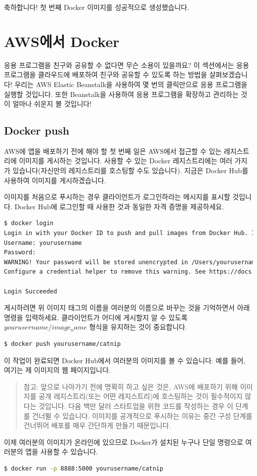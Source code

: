 축하합니다! 첫 번째 Docker 이미지를 성공적으로 생성했습니다.

\section{AWS에서 Docker}
응용 프로그램을 친구와 공유할 수 없다면 무슨 소용이 있을까요? 이 섹션에서는 응용 프로그램을 클라우드에 배포하여 친구와 공유할 수 있도록 하는 방법을 살펴보겠습니다! 우리는 AWS Elastic Beanstalk을 사용하여 몇 번의 클릭만으로 응용 프로그램을 실행할 것입니다. 또한 Beanstalk을 사용하여 응용 프로그램을 확장하고 관리하는 것이 얼마나 쉬운지 볼 것입니다!

\subsection{Docker push}
AWS에 앱을 배포하기 전에 해야 할 첫 번째 일은 AWS에서 접근할 수 있는 레지스트리에 이미지를 게시하는 것입니다. 사용할 수 있는 Docker 레지스트리에는 여러 가지가 있습니다(자신만의 레지스트리를 호스팅할 수도 있습니다). 지금은 Docker Hub를 사용하여 이미지를 게시하겠습니다.

이미지를 처음으로 푸시하는 경우 클라이언트가 로그인하라는 메시지를 표시할 것입니다. Docker Hub에 로그인할 때 사용한 것과 동일한 자격 증명을 제공하세요.
\begin{lstlisting}[language=bash]
$ docker login
Login in with your Docker ID to push and pull images from Docker Hub. If you do not have a Docker ID, head over to https://hub.docker.com to create one.
Username: yourusername
Password:
WARNING! Your password will be stored unencrypted in /Users/yourusername/.docker/config.json
Configure a credential helper to remove this warning. See https://docs.docker.com/engine/reference/commandline/login/credential-store

Login Succeeded
\end{lstlisting}

게시하려면 위 이미지 태그의 이름을 여러분의 이름으로 바꾸는 것을 기억하면서 아래 명령을 입력하세요. 클라이언트가 어디에 게시할지 알 수 있도록 $yourusername/image_name$ 형식을 유지하는 것이 중요합니다.
\begin{lstlisting}[language=bash]
$ docker push yourusername/catnip
\end{lstlisting}

이 작업이 완료되면 Docker Hub에서 여러분의 이미지를 볼 수 있습니다. 예를 들어, 여기는 제 이미지의 웹 페이지입니다.
\begin{quote}
참고: 앞으로 나아가기 전에 명확히 하고 싶은 것은, AWS에 배포하기 위해 이미지를 공개 레지스트리(또는 어떤 레지스트리)에 호스팅하는 것이 필수적이지 않다는 것입니다. 다음 백만 달러 스타트업을 위한 코드를 작성하는 경우 이 단계를 건너뛸 수 있습니다. 이미지를 공개적으로 푸시하는 이유는 중간 구성 단계를 건너뛰어 배포를 매우 간단하게 만들기 때문입니다.
\end{quote}
이제 여러분의 이미지가 온라인에 있으므로 Docker가 설치된 누구나 단일 명령으로 여러분의 앱을 사용할 수 있습니다.
\begin{lstlisting}[language=bash]
$ docker run -p 8888:5000 yourusername/catnip
\end{lstlisting}

